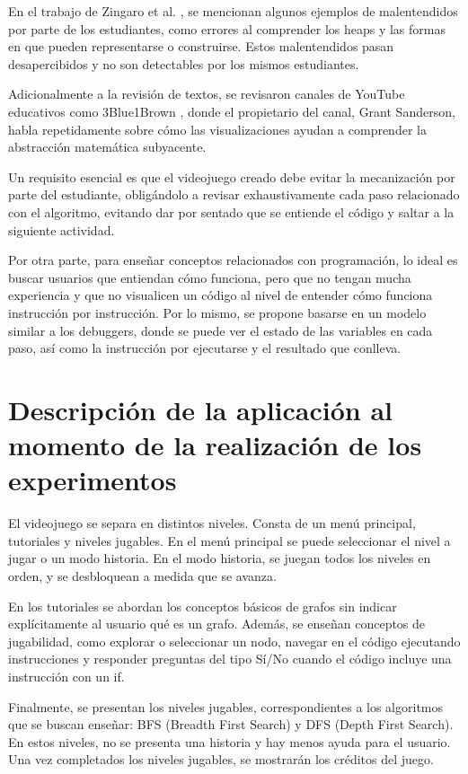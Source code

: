 En el trabajo de Zingaro et al. \cite{IdentifyingStudentDifficultiesDataStructures}, se mencionan algunos ejemplos de malentendidos por parte de los estudiantes, como errores al comprender los heaps y las formas en que pueden representarse o construirse. Estos malentendidos pasan desapercibidos y no son detectables por los mismos estudiantes.

Adicionalmente a la revisión de textos, se revisaron canales de YouTube educativos como 3Blue1Brown \cite{3Blue1BrownYT}, donde el propietario del canal, Grant Sanderson, habla repetidamente sobre cómo las visualizaciones ayudan a comprender la abstracción matemática subyacente.

Un requisito esencial es que el videojuego creado debe evitar la mecanización por parte del estudiante, obligándolo a revisar exhaustivamente cada paso relacionado con el algoritmo, evitando dar por sentado que se entiende el código y saltar a la siguiente actividad.

Por otra parte, para enseñar conceptos relacionados con programación, lo ideal es buscar usuarios que entiendan cómo funciona, pero que no tengan mucha experiencia y que no visualicen un código al nivel de entender cómo funciona instrucción por instrucción. Por lo mismo, se propone basarse en un modelo similar a los debuggers, donde se puede ver el estado de las variables en cada paso, así como la instrucción por ejecutarse y el resultado que conlleva.

\section{Descripción de la aplicación al momento de la realización de los experimentos}

El videojuego se separa en distintos niveles. Consta de un menú principal, tutoriales y niveles jugables. En el menú principal se puede seleccionar el nivel a jugar o un modo historia. En el modo historia, se juegan todos los niveles en orden, y se desbloquean a medida que se avanza.

En los tutoriales se abordan los conceptos básicos de grafos sin indicar explícitamente al usuario qué es un grafo. Además, se enseñan conceptos de jugabilidad, como explorar o seleccionar un nodo, navegar en el código ejecutando instrucciones y responder preguntas del tipo Sí/No cuando el código incluye una instrucción con un if.

Finalmente, se presentan los niveles jugables, correspondientes a los algoritmos que se buscan enseñar: BFS (Breadth First Search) y DFS (Depth First Search). En estos niveles, no se presenta una historia y hay menos ayuda para el usuario. Una vez completados los niveles jugables, se mostrarán los créditos del juego.

